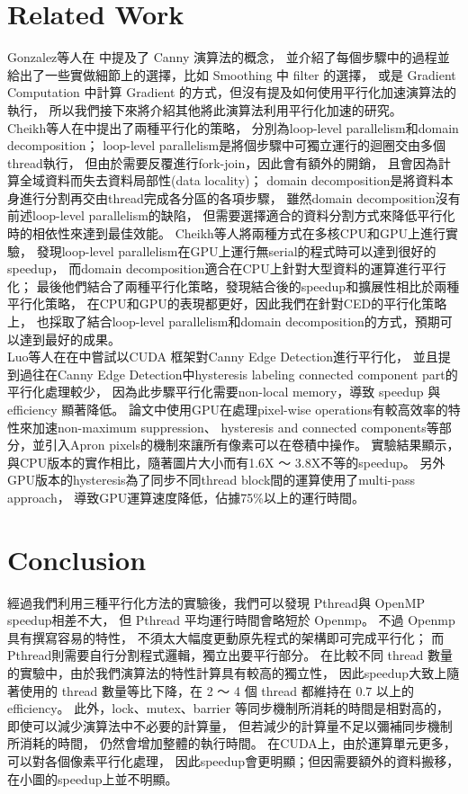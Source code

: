 \documentclass[sigconf,nonacm]{acmart}
\begin{document}
\section{Related Work}

Gonzalez等人在 \cite{gonzalez2018digital} 中提及了 Canny 演算法的概念，
並介紹了每個步驟中的過程並給出了一些實做細節上的選擇，比如 Smoothing 中 filter 的選擇，
或是 Gradient Computation 中計算 Gradient 的方式，但沒有提及如何使用平行化加速演算法的執行，
所以我們接下來將介紹其他將此演算法利用平行化加速的研究。 \\
Cheikh等人在\cite{6328953}中提出了兩種平行化的策略，
分別為loop-level parallelism和domain decomposition；
loop-level parallelism是將個步驟中可獨立運行的迴圈交由多個thread執行，
但由於需要反覆進行fork-join，因此會有額外的開銷，
且會因為計算全域資料而失去資料局部性(data locality)；
domain decomposition是將資料本身進行分割再交由thread完成各分區的各項步驟，
雖然domain decomposition沒有前述loop-level parallelism的缺陷，
但需要選擇適合的資料分割方式來降低平行化時的相依性來達到最佳效能。
Cheikh等人將兩種方式在多核CPU和GPU上進行實驗，
發現loop-level parallelism在GPU上運行無serial的程式時可以達到很好的speedup，
而domain decomposition適合在CPU上針對大型資料的運算進行平行化；
最後他們結合了兩種平行化策略，發現結合後的speedup和擴展性相比於兩種平行化策略，
在CPU和GPU的表現都更好，因此我們在針對CED的平行化策略上，
也採取了結合loop-level parallelism和domain decomposition的方式，預期可以達到最好的成果。 \\
Luo等人在在\cite{4563088}中嘗試以CUDA 框架對Canny Edge Detection進行平行化，
並且提到過往在Canny Edge Detection中hysteresis labeling connected component part的平行化處理較少，
因為此步驟平行化需要non-local memory，導致 speedup 與 efficiency 顯著降低。
論文中使用GPU在處理pixel-wise operations有較高效率的特性來加速non-maximum suppression、
hysteresis and connected components等部分，並引入Apron pixels的機制來讓所有像素可以在卷積中操作。
實驗結果顯示，與CPU版本的實作相比，隨著圖片大小而有1.6X ～ 3.8X不等的speedup。
另外GPU版本的hysteresis為了同步不同thread block間的運算使用了multi-pass approach，
導致GPU運算速度降低，佔據75\%以上的運行時間。

\section{Conclusion}

經過我們利用三種平行化方法的實驗後，我們可以發現 Pthread與 OpenMP speedup相差不大，
但 Pthread 平均運行時間會略短於 Openmp。
不過 Openmp 具有撰寫容易的特性，
不須太大幅度更動原先程式的架構即可完成平行化；
而Pthread則需要自行分割程式邏輯，獨立出要平行部分。
在比較不同 thread 數量的實驗中，由於我們演算法的特性計算具有較高的獨立性，
因此speedup大致上隨著使用的 thread 數量等比下降，在 2 ～ 4 個 thread 都維持在 0.7 以上的 efficiency。
此外，lock、mutex、barrier 等同步機制所消耗的時間是相對高的，
即使可以減少演算法中不必要的計算量，
但若減少的計算量不足以彌補同步機制所消耗的時間，
仍然會增加整體的執行時間。
在CUDA上，由於運算單元更多，可以對各個像素平行化處理，
因此speedup會更明顯；但因需要額外的資料搬移，在小圖的speedup上並不明顯。
\end{document}
